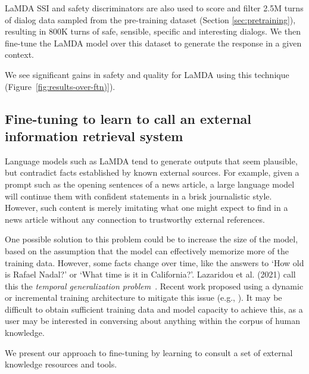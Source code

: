 LaMDA SSI and safety discriminators are also used to score and filter 2.5M turns of dialog data sampled from the pre-training dataset (Section \ref{sec:pretraining}), resulting in 800K turns of safe, sensible, specific and interesting dialogs. We then fine-tune the LaMDA model over this dataset to generate the response in a given context.

We see significant gains in safety and quality for LaMDA using this technique (Figure~\ref{fig:results-over-ftn)}).

\subsection{Fine-tuning to learn to call an external information retrieval system}
\label{sec:factuality}
Language models such as LaMDA tend to generate outputs that seem plausible, but contradict facts established by known external sources. For example, given a prompt such as the opening sentences of a news article, a large language model will continue them with confident statements in a brisk journalistic style. However, such content is merely imitating what one might expect to find in a news article without any connection to trustworthy external references.

One possible solution to this problem could be to increase the size of the model, based on the assumption that the model can effectively memorize more of the training data. However, some facts change over time, like the answers to `How old is Rafael Nadal?' or `What time is it in California?'. Lazaridou et al. (2021) call this the \textit{temporal generalization problem}~\cite{lazaridou2021pitfalls}. Recent work proposed using a dynamic or incremental training architecture to mitigate this issue (e.g., \cite{lazaridou2021pitfalls,hombaiah2021dynamic}). It may be difficult to obtain sufficient training data and model capacity to achieve this, as a user may be interested in conversing about anything within the corpus of human knowledge.

We present our approach to fine-tuning by learning to consult a set of external knowledge resources and tools.

